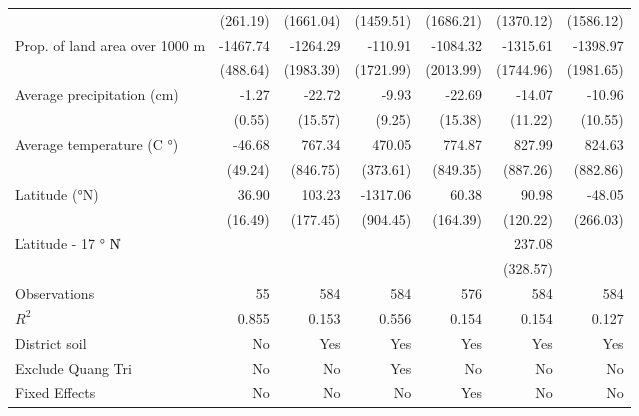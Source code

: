 \begin{table}[htbp]
\begin{tabular}{l*{6}{D{.}{.}{-1}}}
                    &    (261.19)         &   (1661.04)         &   (1459.51)         &   (1686.21)         &   (1370.12)         &   (1586.12)         \\
\addlinespace
Prop. of land area over 1000 m&    -1467.74\sym{***}&    -1264.29         &     -110.91         &    -1084.32         &    -1315.61         &    -1398.97         \\
                    &    (488.64)         &   (1983.39)         &   (1721.99)         &   (2013.99)         &   (1744.96)         &   (1981.65)         \\
\addlinespace
Average precipitation (cm)&       -1.27\sym{**} &      -22.72         &       -9.93         &      -22.69         &      -14.07         &      -10.96         \\
                    &      (0.55)         &     (15.57)         &      (9.25)         &     (15.38)         &     (11.22)         &     (10.55)         \\
\addlinespace
Average temperature (C $°$)&      -46.68         &      767.34         &      470.05         &      774.87         &      827.99         &      824.63         \\
                    &     (49.24)         &    (846.75)         &    (373.61)         &    (849.35)         &    (887.26)         &    (882.86)         \\
\addlinespace
Latitude (°N)       &       36.90\sym{**} &      103.23         &    -1317.06         &       60.38         &       90.98         &      -48.05         \\
                    &     (16.49)         &    (177.45)         &    (904.45)         &    (164.39)         &    (120.22)         &    (266.03)         \\
\addlinespace
\|Latitude - 17 $°$ N\|&                     &                     &                     &                     &      237.08         &                     \\
                    &                     &                     &                     &                     &    (328.57)         &                     \\
\midrule
Observations        &          55         &         584         &         584         &         576         &         584         &         584         \\
\(R^{2}\)           &       0.855         &       0.153         &       0.556         &       0.154         &       0.154         &       0.127         \\
District soil       &          No         &         Yes         &         Yes         &         Yes         &         Yes         &         Yes         \\
Exclude Quang Tri   &          No         &          No         &         Yes         &          No         &          No         &          No         \\
Fixed Effects       &          No         &          No         &          No         &         Yes         &          No         &          No         \\
\bottomrule
\end{tabular}
\end{table}
